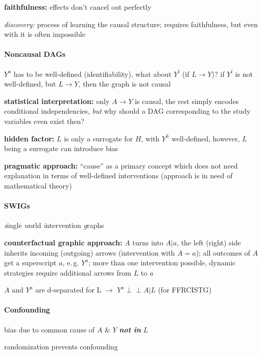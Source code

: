 \documentclass[8pt,twoside]{extarticle}
\newcommand{\indep}{\perp \!\!\! \perp}
\begin{document}
\begin{multicols}{2}
\noindent \textbf{faithfulness:} effects don't cancel out perfectly

\noindent \textit{discovery:} process of learning the causal structure; requires faithfulness, but even with it is often impossible


\paragraph{Noncausal DAGs} \citep{hernan2023causal}
$Y^a$ has to be well-defined (identifiability), what about $Y^l$ (if $L\to Y$)? \newline
if $Y^l$ is not well-defined, but $L \to Y$, then the graph is not causal

\noindent \textbf{statistical interpretation:} only $A\to Y$ is causal, the rest simply encodes conditional independencies, \textit{but} why should a DAG corresponding to the study variables even exist then?

\noindent \textbf{hidden factor:} $L$ is only a surrogate for $H$, with $Y^h$ well-defined, however, $L$ being a surrogate can introduce bias

\noindent \textbf{pragmatic approach:} ``cause'' as a primary concept which does not need explanation in terms of well-defined interventions (approach is in need of mathematical theory)



\paragraph{SWIGs} \textit{s}ingle \textit{w}orld \textit{i}ntervention \textit{g}raphs

\noindent \textbf{counterfactual graphic approach:}
$A$ turns into $A|a$, the left (right) side inherits incoming (outgoing) arrows (intervention with $A=a$); all outcomes of $A$ get a superscript $a$, e.\,g. $Y^a$; more than one intervention possible, dynamic strategies require additional arrows from $L$ to $a$


\noindent $A$ and $Y^a$ are d-separated  for L $\rightarrow$ $Y^a \indep A|L$ (for FFRCISTG)



\paragraph{Confounding} bias due to common cause of $A$ \& $Y$ \textbf{\textit{not in}} $L$

\noindent randomization prevents confounding


\end{multicols}
\end{document}

